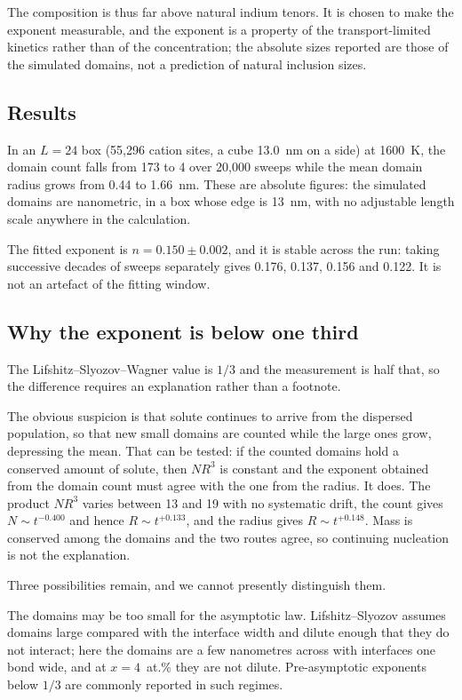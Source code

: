\documentclass[preprint,12pt,authoryear]{elsarticle}
\begin{document}
The composition is thus far above natural indium tenors. It is chosen to make
the exponent measurable, and the exponent is a property of the transport-limited
kinetics rather than of the concentration; the absolute sizes reported are those
of the simulated domains, not a prediction of natural inclusion sizes.

\subsection{Results}

In an $L = 24$ box (55{,}296 cation sites, a cube 13.0~nm on a side) at 1600~K,
the domain count falls from 173 to 4 over 20{,}000 sweeps while the mean domain
radius grows from 0.44 to 1.66~nm. These are absolute figures: the simulated
domains are nanometric, in a box whose edge is 13~nm, with no adjustable length
scale anywhere in the calculation.

The fitted exponent is $n = 0.150 \pm 0.002$, and it is stable across the run:
taking successive decades of sweeps separately gives 0.176, 0.137, 0.156 and
0.122. It is not an artefact of the fitting window.

\subsection{Why the exponent is below one third}

The Lifshitz--Slyozov--Wagner value is $1/3$ and the measurement is half that,
so the difference requires an explanation rather than a footnote.

The obvious suspicion is that solute continues to arrive from the dispersed
population, so that new small domains are counted while the large ones grow,
depressing the mean. That can be tested: if the counted domains hold a
conserved amount of solute, then $N R^3$ is constant and the exponent obtained
from the domain count must agree with the one from the radius. It does. The
product $N R^3$ varies between 13 and 19 with no systematic drift, the count
gives $N \sim t^{-0.400}$ and hence $R \sim t^{+0.133}$, and the radius gives
$R \sim t^{+0.148}$. Mass is conserved among the domains and the two routes
agree, so continuing nucleation is not the explanation.

Three possibilities remain, and we cannot presently distinguish them.

The domains may be too small for the asymptotic law. Lifshitz--Slyozov assumes
domains large compared with the interface width and dilute enough that they do
not interact; here the domains are a few nanometres across with interfaces one
bond wide, and at $x = 4$~at.\% they are not dilute. Pre-asymptotic exponents
below $1/3$ are commonly reported in such regimes.
\end{document}
